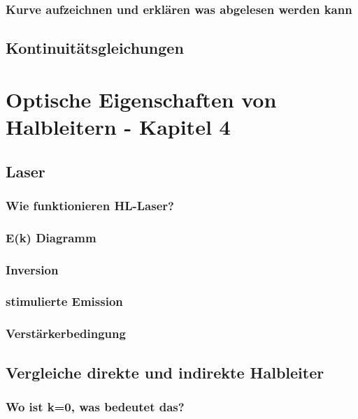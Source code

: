 \documentclass{article}
\begin{document}
    \subsubsection{Kurve aufzeichnen und erkl\"aren was abgelesen werden kann}

\subsection{Kontinuit\"atsgleichungen}\label{k3:kontinuitaet}

\section{Optische Eigenschaften von Halbleitern - Kapitel 4}

\subsection{Laser}\label{k4:laser}
    \subsubsection{Wie funktionieren HL-Laser?}
    \subsubsection{E(k) Diagramm}
    \subsubsection{Inversion}
    \subsubsection{stimulierte Emission}
    \subsubsection{Verst\"arkerbedingung}

\subsection{Vergleiche direkte und indirekte Halbleiter}\label{k4:inUndIndirekt}
    \subsubsection{Wo ist k=0, was bedeutet das?}
\end{document}
